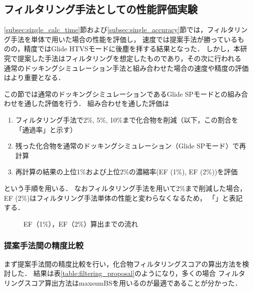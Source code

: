 \newpage

\subsection{フィルタリング手法としての性能評価実験}
\ref{subsec:single_calc_time}節および\ref{subsec:single_accuracy}節では，フィルタリング手法を単体で用いた場合の性能を評価し，
速度では提案手法が勝っているものの，精度ではGlide HTVSモードに後塵を拝する結果となった．
しかし，本研究で提案した手法はフィルタリングを想定したものであり，その次に行われる
通常のドッキングシミュレーション手法と組み合わせた場合の速度や精度の評価はより重要となる．


この節では通常のドッキングシミュレーションであるGlide SPモードとの組み合わせを通した評価を行う．
組み合わせを通した評価は
\begin{enumerate}
\item フィルタリング手法で2\%, 5\%, 10\%まで化合物を削減（以下，この割合を「通過率」と示す）
\item 残った化合物を通常のドッキングシミュレーション（Glide SPモード）で再計算
\item 再計算の結果の上位1\%および上位2\%の濃縮率(EF (1\%), EF (2\%))を評価
\end{enumerate}
という手順を用いる．
なおフィルタリング手法を用いて2\%まで削減した場合，EF (2\%)はフィルタリング手法単体の性能と変わらなくなるため，
「\textendash」と表記する．

\begin{figure}[htp]
 \begin{center}
  \caption{EF（1\%），EF（2\%）算出までの流れ}
  \label{fig:filtering_image}
 \end{center}
\end{figure}

\newpage

\subsubsection{提案手法間の精度比較}\label{subsubsec:filtering_proposal}
まず提案手法間の精度比較を行い，化合物フィルタリングスコアの算出方法を検討した．
結果は表\ref{table:filtering_proposal}のようになり，多くの場合
フィルタリングスコア算出方法はmaxsumBSを用いるのが最適であることが分かった．

